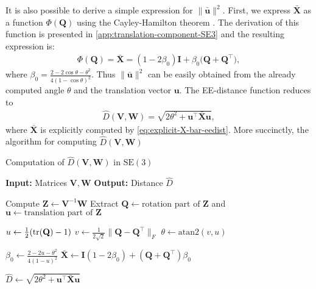 It is also possible to derive a simple expression for $\|\bar{\mathbf{u}}\|^2$. First, we express $\bar{\mathbf{X}}$ as a function $\Phi(\mathbf{Q})$ using the Cayley-Hamilton theorem \citep[p. 63]{Chen2009}. The derivation of this function is presented in \cref{app:translation-component-SE3} and the resulting expression is:
\begin{align}
    \Phi(\mathbf{Q}) = \bar{\mathbf{X}} = (1-2\beta_0)\mathbf{I} + \beta_0\bigl(\mathbf{Q} + \mathbf{Q}^\top\bigr), \label{eq:explicit-X-bar-eedist}
\end{align}
where $\beta_0=\frac{2-2\cos\theta-\theta^2}{4(1 - \cos\theta)^2}$. Thus $\|\bar{\mathbf{u}}\|^2$ can be easily obtained from the already computed angle $\theta$ and the translation vector $\mathbf{u}$. The EE-distance function reduces to
\begin{align}
    \widehat{D}(\mathbf{V}, \mathbf{W}) = \sqrt{2\theta^2 + \mathbf{u}^\top\bar{\mathbf{X}}\mathbf{u}}, \label{eq:explicit-EE-distance-SE3}
\end{align}
where $\bar{\mathbf{X}}$ is explicitly computed by \eqref{eq:explicit-X-bar-eedist}. More succinctly, the algorithm for computing $\widehat{D}(\mathbf{V}, \mathbf{W})$ 
\begin{algorithm}
    \caption{Computation of $\widehat{D}(\mathbf{V}, \mathbf{W})$ in $\text{SE}(3)$}
    \label{alg:dhat-se3}
    \begin{algorithmic}[1]
        \Statex \textbf{Input:} Matrices $\mathbf{V}, \mathbf{W}$
        \Statex \textbf{Output:} Distance $\widehat{D}$
        
        \State Compute $\mathbf{Z} \gets \mathbf{V}^{-1}\mathbf{W}$
        \State Extract $\mathbf{Q} \gets \text{rotation part of } \mathbf{Z}$ and $\mathbf{u} \gets \text{translation part of } \mathbf{Z}$

        \State $u \gets \frac{1}{2} (\operatorname{tr}(\mathbf{Q}) - 1)$
        \State $v \gets \frac{1}{2\sqrt{2}} \|\mathbf{Q} - \mathbf{Q}^\top\|_F$
        \State $\theta \gets \text{atan2}(v, u)$

        \State $\beta_0 \gets \frac{2 - 2u - \theta^2}{4(1 - u)^2}$
        \State $\bar{\mathbf{X}} \gets \mathbf{I}(1 - 2\beta_0) + (\mathbf{Q} + \mathbf{Q}^\top)\beta_0$

        \State $\widehat{D} \gets \sqrt{2\theta^2 + \mathbf{u}^\top \bar{\mathbf{X}} \mathbf{u}}$
    \end{algorithmic}
\end{algorithm}

